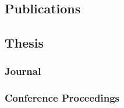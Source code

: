 \subsection*{Publications} 
{}

\nocite{kulumani2022,
    kulumani2017a,
    kulumani2016d,
    kulumani2016c,
    kulumani2016,
    kulumani2015,
    kulumani2013,
    kulumani2017,
    kulumani2017b,
    kulumani2018,
    kulumani2018a,
    kulumani2018b}
\subsection*{Thesis}
\printbibliography[heading=none, type=thesis, resetnumbers]
\subsubsection*{Journal}
\printbibliography[heading=none, type=article, resetnumbers]
\subsubsection*{Conference Proceedings}
\printbibliography[heading=none, type=inproceedings, resetnumbers]
